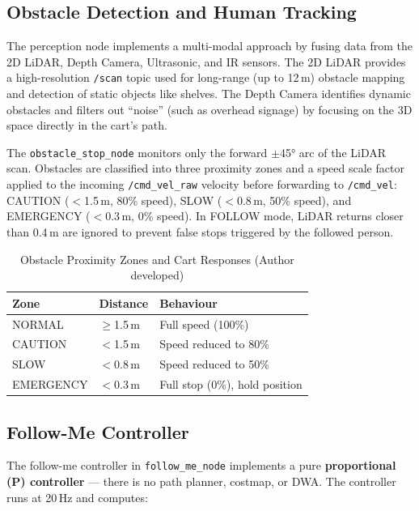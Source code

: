 \subsection{Obstacle Detection and Human Tracking}

The perception node implements a multi-modal approach by fusing data from
the 2D LiDAR, Depth Camera, Ultrasonic, and IR sensors. The 2D LiDAR
provides a high-resolution \texttt{/scan} topic used for long-range (up
to 12\,m) obstacle mapping and detection of static objects like shelves.
The Depth Camera identifies dynamic obstacles and filters out ``noise''
(such as overhead signage) by focusing on the 3D space directly in the
cart's path.

The \texttt{obstacle\_stop\_node} monitors only the forward 
$\pm$45° arc of the LiDAR scan. Obstacles are classified into 
three proximity zones and a speed scale factor applied to the 
incoming \texttt{/cmd\_vel\_raw} velocity before forwarding to 
\texttt{/cmd\_vel}: CAUTION ($<$1.5\,m, 80\% speed), 
SLOW ($<$0.8\,m, 50\% speed), and EMERGENCY ($<$0.3\,m, 0\% speed). 
In FOLLOW mode, LiDAR returns closer than 0.4\,m are ignored to 
prevent false stops triggered by the followed person.

\begin{table}[!ht]
\caption{Obstacle Proximity Zones and Cart Responses (Author developed)}
\label{tab:zones}
\centering
\footnotesize
\begin{tabular}{p{1.5cm} p{1.8cm} p{3.3cm}}
\toprule
\textbf{Zone} & \textbf{Distance} & \textbf{Behaviour} \\
\midrule
NORMAL    & $\geq$1.5\,m      & Full speed (100\%) \\
CAUTION   & $<$1.5\,m         & Speed reduced to 80\% \\
SLOW      & $<$0.8\,m         & Speed reduced to 50\% \\
EMERGENCY & $<$0.3\,m         & Full stop (0\%), hold position \\
\bottomrule
\end{tabular}
\end{table}

\subsection{Follow-Me Controller}

The follow-me controller in \texttt{follow\_me\_node} implements a 
pure \textbf{proportional (P) controller} --- there is no path planner, 
costmap, or DWA. The controller runs at 20\,Hz and computes:

